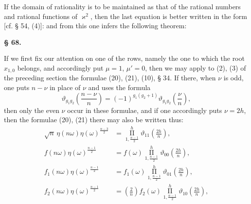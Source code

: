 
If the domain of rationality is to be maintained as that of the rational numbers and rational functions of $\varkappa^2$, then the last equation is better written in the form [cf. § 54, (4)]:
and from this one infers the following theorem:


\begin{center}
\textbf{§ 68.} \textbf{}
\end{center}

If we first fix our attention on one of the rows, namely the one to which the root $x_{1,0}$ belongs, and accordingly put $\mu = 1$, $\mu' = 0$, then we may apply to (2), (3) of the preceding section the formulae (20), (21), (10), § 34. If there, when $\nu$ is odd, one puts $n - \nu$ in place of $\nu$ and uses the formula
\[
\vartheta_{g_1g_2}\left(\frac{n-\nu}{n}\right) = (-1)^{g_1(g_2+1)}\vartheta_{g_1g_2}\left(\frac{\nu}{n}\right),
\]
then only the even $\nu$ occur in these formulae, and if one accordingly puts $\nu = 2h$, then the formulae (20), (21) there may also be written thus:
\[
\begin{aligned}
\sqrt{n}\,\eta(n\omega)\eta(\omega)^{\frac{n-3}{2}} &= \mathop{\Pi}\limits_{1,\frac{n-1}{2}}^{h}\vartheta_{11}\!\left(\frac{2h}{n}\right),\\
f(n\omega)\eta(\omega)^{\frac{n-1}{2}} &= f(\omega)\mathop{\Pi}\limits_{1,\frac{n-1}{2}}^{h}\vartheta_{00}\!\left(\frac{2h}{n}\right),\\
f_1(n\omega)\eta(\omega)^{\frac{n-1}{2}} &= f_1(\omega)\mathop{\Pi}\limits_{1,\frac{n-1}{2}}^{h}\vartheta_{01}\!\left(\frac{2h}{n}\right),\\
f_2(n\omega)\eta(\omega)^{\frac{n-1}{2}} &= \left(\frac{2}{n}\right)f_2(\omega)\mathop{\Pi}\limits_{1,\frac{n-1}{2}}^{h}\vartheta_{10}\!\left(\frac{2h}{n}\right),
\end{aligned}
\]
